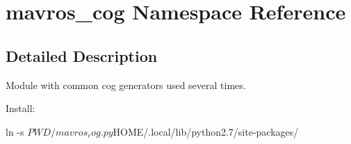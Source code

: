 \hypertarget{namespacemavros__cog}{}\section{mavros\+\_\+cog Namespace Reference}
\label{namespacemavros__cog}


\subsection{Detailed Description}
\begin{DoxyVerb}Module with common cog generators used several times.

Install:

ln -s $PWD/mavros_cog.py $HOME/.local/lib/python2.7/site-packages/
\end{DoxyVerb}
 